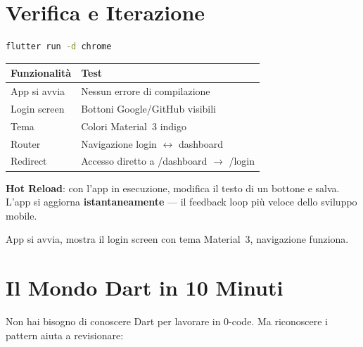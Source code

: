 \section{Verifica e Iterazione}

\begin{praticabox}[title={Pratica --- Avvia l'app}]
\begin{lstlisting}[language=bash]
flutter run -d chrome
\end{lstlisting}
\end{praticabox}

\begin{center}
\begin{tabularx}{\textwidth}{l X}
\toprule
\textbf{Funzionalità} & \textbf{Test} \\
\midrule
App si avvia & Nessun errore di compilazione \\
Login screen & Bottoni Google/GitHub visibili \\
Tema & Colori Material~3 indigo \\
Router & Navigazione login $\leftrightarrow$ dashboard \\
Redirect & Accesso diretto a /dashboard $\rightarrow$ /login \\
\bottomrule
\end{tabularx}
\end{center}

\textbf{Hot Reload}: con l'app in esecuzione, modifica il testo di un bottone e salva. L'app si aggiorna \textbf{istantaneamente} --- il feedback loop più veloce dello sviluppo mobile.

\begin{checkpointbox}
App si avvia, mostra il login screen con tema Material~3, navigazione funziona.
\end{checkpointbox}

\section{Il Mondo Dart in 10 Minuti}

Non hai bisogno di conoscere Dart per lavorare in 0-code. Ma riconoscere i pattern aiuta a revisionare:

